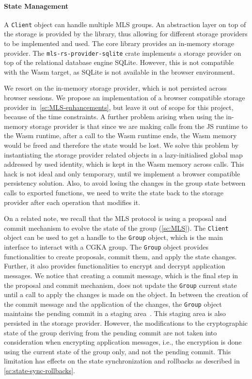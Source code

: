\paragraph{State Management}
A \texttt{Client} object can handle multiple MLS groups.
An abstraction layer on top of the storage is provided by the library,
thus allowing for different storage providers to be implemented and used.
The core library provides an in-memory storage provider.
The \texttt{mls-rs-provider-sqlite} crate implements a storage provider
on top of the relational database engine SQLite. However, this is not compatible
with the Wasm target, as SQLite is not available in the browser environment.

We resort on the in-memory storage provider, which is not persisted
across browser sessions. We propose an implementation of a browser compatible
storage provider in~\cref{sc:MLS-enhancements}, but leave it out of scope
for this project, because of the time constraints.
A further problem arising when using the in-memory storage provider
is that since we are making calls from the JS runtime to the Wasm runtime,
after a call to the Wasm runtime ends, the Wasm memory would be freed and
therefore the state would be lost.
We solve this problem by instantiating the storage provider related objects
in a lazy-initialised global map addressed by used identity, which is kept in
the Wasm memory across calls. This hack is not ideal and only temporary,
until we implement a browser compatible persistency solution.
Also, to avoid losing the changes in the group state between calls to
exported functions, we need to write the state back to the storage provider
after each operation that modifies it.

On a related note, we recall that the MLS protocol is using a proposal
and commit mechanism to evolve the state of the group (\cref{sc:MLS}).
The \texttt{Client} object can be used to get a handle to the \texttt{Group}
object, which is the main interface to interact with a CGKA group.
The \texttt{Group} object provides functionalities to create proposals,
commit them, and apply the state changes. Further, it also provides
functionalities to encrypt and decrypt application messages.
We notice that creating a commit message, which is the final step
in the proposal and commit mechanism, does not update the \texttt{Group}
current state until a call to apply the changes is made on the object.
In between the creation of the commit message and the
application of the changes, the \texttt{Group} object maintains
the pending commit in a staging area~\cite{AWSMLSGroup}.
This staging area is also persisted in the storage provider.
However, the modifications to the cryptographic state of the group
deriving from the pending commit are not taken into consideration
when encrypting application messages, i.e., the encryption
is done using the current state of the group only, and not the pending commit.
This limitation has effects on the state synchronization and rollbacks
as described in \cref{sc:state-sync-rollbacks}.


